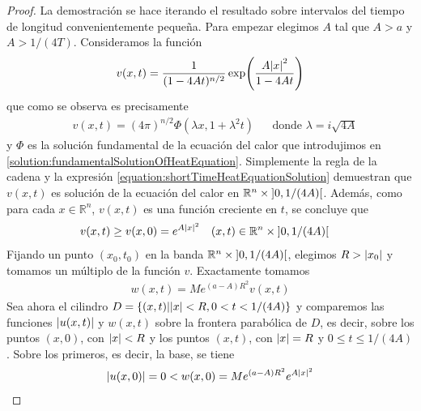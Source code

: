 \documentclass{article}
\newcommand{\realNumbers}{\mathbb{R}}
\theoremstyle{definition}
\theoremstyle{remark}
\newcommand{\leftOpenInterval}{\left]}
\newcommand{\rightOpenInterval}{\right[}
\newcommand{\leftClosedInterval}{\left[}
\newcommand{\rightClosedInterval}{\right]}
\newcommand{\interval}[3]{%
  \ifstrequal{#1}{oo}{%
    \leftOpenInterval #2, #3 \rightOpenInterval%
  }{%
    \ifstrequal{#1}{co}{%
      \leftClosedInterval #2, #3 \rightOpenInterval%
    }{%
      \ifstrequal{#1}{oc}{
        \leftOpenInterval #2, #3 \rightClosedInterval%
      }{%
        \ifstrequal{#1}{cc}{
          \leftClosedInterval #2, #3 \rightClosedInterval
        }{%
        }%
      }%
    }%
  }%
}
\begin{document}
  \begin{proof}
    La demostración se hace iterando el resultado sobre intervalos del tiempo de longitud convenientemente pequeña.
    Para empezar elegimos \(A\) tal que \(A > a\) y 
    \(A > 1 / (4 T)\).  %
    Consideramos la función
    \begin{align}
      v(x, t) = \frac{1}{(1 - 4 A t)^{n / 2}} \exp\!\left(\frac{A \abs{x}^2}{1 - 4 A t}\right)
    \end{align}
    que como se observa es precisamente
    \begin{align}
      \label{equation:shortTimeHeatEquationSolution}
      &v(x, t)
      =
      (4 \pi)^{n / 2} \Phi(\lambda x, 1 + \lambda^2 t)
      && \text{donde } \lambda = i \sqrt{4A}
    \end{align}
    y \(\Phi\) es la solución fundamental de la ecuación del calor que introdujimos en \ref{solution:fundamentalSolutionOfHeatEquation}.
    Simplemente la regla de la cadena y la expresión
    \ref{equation:shortTimeHeatEquationSolution}
    demuestran que \(v(x, t)\) es solución de la ecuación del calor en \(\realNumbers^n \times \interval{oo}{0}{1 / (4 A)}\).
    Además, como para cada \(x \in \realNumbers^n\), \(v(x, t)\) es una función creciente en \(t\), se concluye que
    \begin{align}
      &v(x, t)
      \geq
      v(x, 0)
      =
      e^{A \abs{x}^2}
      && (x, t) \in \realNumbers^n \times \interval{oo}{0}{1 / (4 A)}
    \end{align}
    Fijando un punto \((x_0, t_0)\) en la banda \(\realNumbers^n \times \interval{oo}{0}{1 / (4 A)}\), elegimos \(R > \abs{x_0}\) y tomamos un múltiplo de la función \(v\).
    Exactamente tomamos
    \begin{align}
      w(x, t)
      =
      M e^{(a - A) R^2} v(x, t)
    \end{align}
    Sea ahora el cilindro \(D = \{(x, t) | \abs{x} < R, 0 < t < 1 / (4 A)\}\) y comparemos las funciones \(\abs{u(x, t)}\) y \(w(x, t)\) sobre la frontera parabólica de \(D\), es decir, sobre los puntos \((x, 0)\), con \(\abs{x} < R\) y los puntos \((x, t)\), con \(\abs{x} = R\) y \(0 \leq t \leq 1 / (4 A)\).
    Sobre los primeros, es decir, la base, se tiene 
    \begin{align}
      \abs{u(x, 0)}
      =
      0
      <
      w(x, 0)
      =
      M e^{(a - A) R^2} e^{A \abs{x}^2}
    \end{align}

\end{proof}
\end{document}
